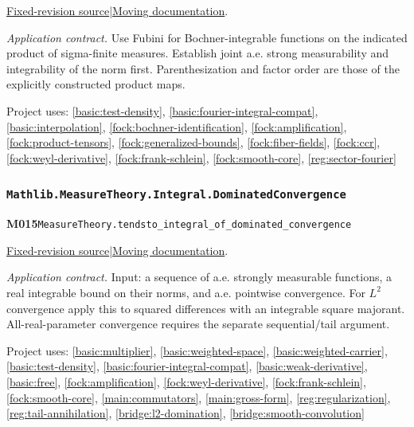 \documentclass[11pt,a4paper]{article}
\theoremstyle{definition}
\theoremstyle{remark}
\begin{document}
\href{https://github.com/leanprover-community/mathlib4/blob/9bac2d0692944a775113f7c130fd5e5b4608a854/Mathlib/MeasureTheory/Integral/Prod.lean}{Fixed-revision source}\quad|\quad\href{https://leanprover-community.github.io/mathlib4_docs/Mathlib/MeasureTheory/Integral/Prod.html#MeasureTheory.integral_prod}{Moving documentation}.\par
\noindent\textit{Application contract.} Use Fubini for Bochner-integrable functions on the indicated product of sigma-finite measures. Establish joint a.e. strong measurability and integrability of the norm first. Parenthesization and factor order are those of the explicitly constructed product maps.\par
{\small Project uses: \ref{basic:test-density}, \ref{basic:fourier-integral-compat}, \ref{basic:interpolation}, \ref{fock:bochner-identification}, \ref{fock:amplification}, \ref{fock:product-tensors}, \ref{fock:generalized-bounds}, \ref{fock:fiber-fields}, \ref{fock:ccr}, \ref{fock:weyl-derivative}, \ref{fock:frank-schlein}, \ref{fock:smooth-core}, \ref{reg:sector-fourier}}\par\medskip

\subsubsection*{\nolinkurl{Mathlib.MeasureTheory.Integral.DominatedConvergence}}
\noindent\textbf{M015}\label{base:M015}\quad\nolinkurl{MeasureTheory.tendsto_integral_of_dominated_convergence}

\href{https://github.com/leanprover-community/mathlib4/blob/9bac2d0692944a775113f7c130fd5e5b4608a854/Mathlib/MeasureTheory/Integral/DominatedConvergence.lean}{Fixed-revision source}\quad|\quad\href{https://leanprover-community.github.io/mathlib4_docs/Mathlib/MeasureTheory/Integral/DominatedConvergence.html#MeasureTheory.tendsto_integral_of_dominated_convergence}{Moving documentation}.\par
\noindent\textit{Application contract.} Input: a sequence of a.e. strongly measurable functions, a real integrable bound on their norms, and a.e. pointwise convergence. For $L^2$ convergence apply this to squared differences with an integrable square majorant. All-real-parameter convergence requires the separate sequential/tail argument.\par
{\small Project uses: \ref{basic:multiplier}, \ref{basic:weighted-space}, \ref{basic:weighted-carrier}, \ref{basic:test-density}, \ref{basic:fourier-integral-compat}, \ref{basic:weak-derivative}, \ref{basic:free}, \ref{fock:amplification}, \ref{fock:weyl-derivative}, \ref{fock:frank-schlein}, \ref{fock:smooth-core}, \ref{main:commutators}, \ref{main:gross-form}, \ref{reg:regularization}, \ref{reg:tail-annihilation}, \ref{bridge:l2-domination}, \ref{bridge:smooth-convolution}}\par\medskip
\end{document}
